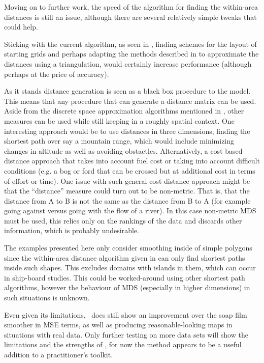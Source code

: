 Moving on to further work, the speed of the algorithm for finding the within-area distances is still an issue, although there are several relatively simple tweaks that could help.

Sticking with the current algorithm, as seen in , finding schemes for the layout of starting grids and perhaps adapting the methods described in  to approximate the distances using a triangulation, would certainly increase performance (although perhaps at the price of accuracy).

As it stands distance generation is seen as a black box procedure to the model. This means that any procedure that can generate a distance matrix can be used. Aside from the discrete space approximation algorithms mentioned in , other measures can be used while still keeping in a roughly spatial context. One interesting approach would be to use distances in three dimensions, finding the shortest path over say a mountain range, which would include minimizing changes in altitude as well as avoiding obstactles. Alternatively, a cost based distance approach that takes into account fuel cost or taking into account difficult conditions (e.g. a bog or ford that can be crossed but at additional cost in terms of effort or time). One issue with such general cost-distance approach might be that the ``distance'' measure could turn out to be non-metric. That is, that the distance from A to B is not the same as the distance from B to A (for example going against versus going with the flow of a river). In this case non-metric MDS must be used, this relies only on the rankings of the data and discards other information, which is probably undesirable.

The examples presented here only consider smoothing inside of simple polygons since the within-area distance algorithm given in  can only find shortest paths inside such shapes. This excludes domains with islands in them, which can occur in ship-board studies. This could be worked-around using other shortest path algorithms, however the behaviour of MDS (especially in higher dimensions) in such situations is unknown.

Even given its limitations, \mdsds\ does still show an improvement over the soap film smoother in MSE terms, as well as producing reasonable-looking maps in situations with real data. Only further testing on more data sets will show the limitations and the strengths of \mdsds, for now the method appears to be a useful addition to a practitioner's toolkit.

